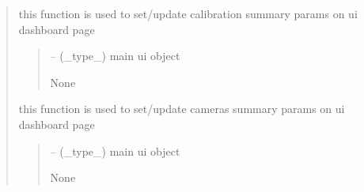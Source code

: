 \documentclass[letterpaper,10pt,english]{sphinxmanual}
\begin{document}
\begin{quote}
\begin{savenotes}\begin{fulllineitems}
\label{\detokenize{setting/backend/camera_funcs:oxin.backend.camera_funcs.show_calibration_summary}}
\pysigstartsignatures
{}
\pysigstopsignatures
\sphinxAtStartPar
this function is used to set/update calibration summary params on ui dashboard page
\begin{quote}\begin{description}
\sphinxAtStartPar
{} – (\_type\_) main ui object

\sphinxAtStartPar
None

\end{description}\end{quote}

\end{fulllineitems}\end{savenotes}


\begin{savenotes}\begin{fulllineitems}
\label{\detokenize{setting/backend/camera_funcs:oxin.backend.camera_funcs.show_cameras_summary}}
\pysigstartsignatures
{}
\pysigstopsignatures
\sphinxAtStartPar
this function is used to set/update cameras summary params on ui dashboard page
\begin{quote}\begin{description}
\sphinxAtStartPar
{} – (\_type\_) main ui object

\sphinxAtStartPar
None

\end{description}\end{quote}

\end{fulllineitems}\end{savenotes}


\end{quote}
\end{document}
